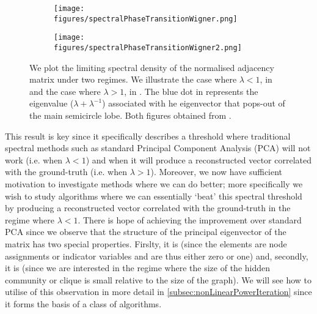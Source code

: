 \begin{figure}
	\centering
	\begin{subfigure}{.5\textwidth}
		\centering
		\texttt{[image: figures/spectralPhaseTransitionWigner.png]}
		\caption{}
		\label{fig:spectralPhaseTransitionWigner}
	\end{subfigure}%
	\begin{subfigure}{.5\textwidth}
		\centering
		\texttt{[image: figures/spectralPhaseTransitionWigner2.png]}
		\caption{}
		\label{fig:spectralPhaseTransitionWigner2}
	\end{subfigure}
	\caption[Plots illustrating spectral phase transition of Wigner Matrices.]{\label{fig:spectralPhaseTransitionWignerPlots} We plot the limiting spectral density of the normalised adjacency matrix under two regimes. We illustrate the case where $\lambda < 1$, in  and the case where $\lambda > 1$, in . The blue dot in  represents the eigenvalue ($\lambda + \lambda^{-1}$) associated with he eigenvector that pops-out of the main semicircle lobe. Both figures obtained from \cite{Mon13}.}
\end{figure}

This result is key since it specifically describes a threshold where traditional spectral methods such as standard Principal Component Analysis (PCA) will not work (i.e. when $\lambda < 1$) and when it will produce a reconstructed vector correlated with the ground-truth (i.e. when $\lambda > 1$).
Moreover, we now have sufficient motivation to investigate methods where we can do better; more specifically we wish to study algorithms where we can essentially `beat' this spectral threshold by producing a reconstructed vector correlated with the ground-truth in the regime where $\lambda < 1$.
There is hope of achieving the improvement over standard PCA since we observe that the structure of the principal eigenvector of the matrix has two special properties.
Firslty, it is  (since the elements are node assignments or indicator variables and are thus either zero or one) and, secondly, it is  (since we are interested in the regime where the size of the hidden community or clique is small relative to the size of the graph).
We will see how to utilise of this observation in more detail in \cref{subsec:nonLinearPowerIteration} since it forms the basis of a class of algorithms.

